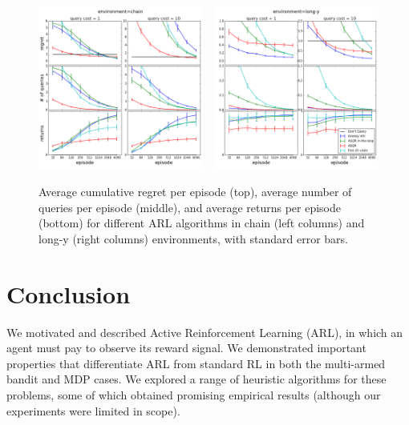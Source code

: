 \documentclass{article}
\begin{document}
\begin{figure}[ht!]
\centering
\includegraphics[width=0.48\textwidth]{FILM_chain.png}%
~
\includegraphics[width=0.48\textwidth]{FILM_Y.png}
\caption{
Average cumulative regret per episode (top), average number of queries per episode (middle), and average returns per episode (bottom) for different ARL algorithms in chain (left columns) and long-y (right columns) environments, with standard error bars.
}
\label{fig:MDPs}
\end{figure}





\FloatBarrier
\section{Conclusion}

We motivated and described Active Reinforcement Learning (ARL), in which an agent must pay to observe its reward signal. We demonstrated important properties that differentiate ARL from standard RL in both the multi-armed bandit and MDP cases. We explored a range of heuristic algorithms for these problems, some of which obtained promising empirical results (although our experiments were limited in scope).
\end{document}
